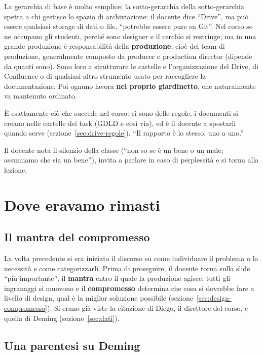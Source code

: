 La gerarchia di base è molto semplice; la sotto-gerarchia della
sotto-gerarchia spetta a chi gestisce lo spazio di archiviazione: il docente
dice ``Drive'', ma può essere qualsiasi storage di dati o file, ``potrebbe
essere pure su Git''. Nel corso se ne occupano gli studenti, perché sono
designer e il cerchio si restringe; ma in una grande produzione è
responsabilità della \textbf{produzione}, cioè del team di produzione,
generalmente composto da producer e production director (dipende da quanti
sono). Sono loro a strutturare le cartelle e l'organizzazione del Drive, di
Confluence o di qualsiasi altro strumento usato per raccogliere la
documentazione. Poi ognuno lavora \textbf{nel proprio giardinetto}, che
naturalmente va mantenuto ordinato.

È esattamente ciò che succede nel corso: ci sono delle regole, i documenti si
creano nelle cartelle dei task (GDLD e così via), ed è il docente a spostarli
quando serve (sezione~\ref{sec:drive-regole}). ``Il rapporto è lo stesso,
uno a uno.''

Il docente nota il silenzio della classe (``non so se è un bene o un male;
assumiamo che sia un bene''), invita a parlare in caso di perplessità e si
torna alla lezione.

\section{Dove eravamo rimasti}
\label{sec:ripresa-gd5}

\subsection{Il mantra del compromesso}

La volta precedente si era iniziato il discorso su come individuare il
problema o la necessità e come categorizzarli. Prima di proseguire, il
docente torna sulla slide ``più importante'', il \textbf{mantra} entro il
quale la produzione agisce: tutti gli ingranaggi si muovono e il
\textbf{compromesso} determina che cosa si dovrebbe fare a livello di design,
qual è la miglior soluzione possibile (sezione~\ref{sec:design-compromesso}).
Si erano già viste la citazione di Diego, il direttore del corso, e quella di
Deming (sezione~\ref{sec:dati}).

\subsection{Una parentesi su Deming}

